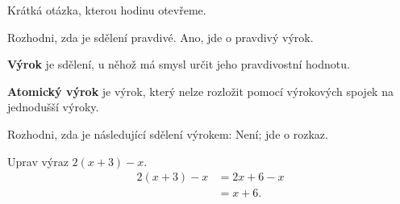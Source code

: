 \documentclass[11pt,a4paper]{article}
\begin{document}
Krátká otázka, kterou hodinu otevřeme.

\begin{prikladReseniBox}
Rozhodni, zda je sdělení  pravdivé.
\tcblower
Ano, jde o pravdivý výrok.
\end{prikladReseniBox}

\begin{definiceBox}
\textbf{Výrok} je sdělení, u něhož má smysl určit jeho pravdivostní hodnotu.
\end{definiceBox}

\begin{definiceBox}
\textbf{Atomický výrok} je výrok, který nelze rozložit pomocí výrokových
spojek na jednodušší výroky.
\end{definiceBox}

\begin{zadaniReseniBox}
Rozhodni, zda je následující sdělení výrokem: 
\tcblower
Není; jde o rozkaz.
\end{zadaniReseniBox}

\begin{prikladReseniBox}
Uprav výraz $2(x+3)-x$.
\tcblower
\begin{align*}
2(x+3)-x &= 2x+6-x \\
         &= x+6.
\end{align*}
\end{prikladReseniBox}

\end{document}
